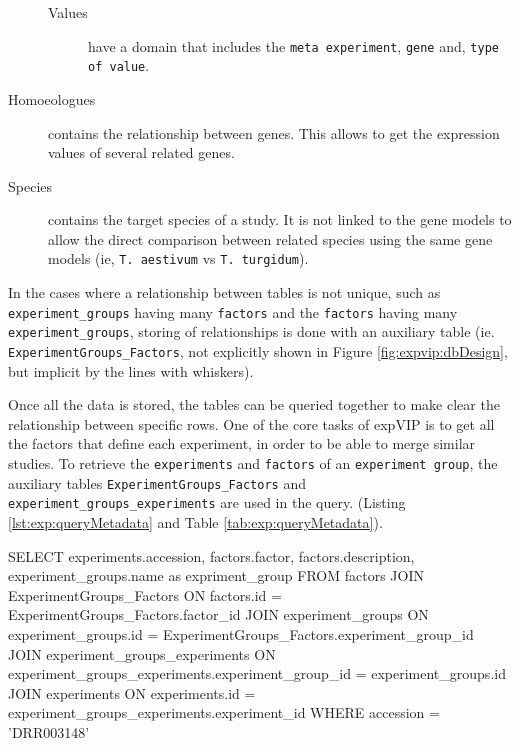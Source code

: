 \begin{description}
\begin{description}
\item[Values] have a domain that includes the \texttt{meta experiment}, \texttt{gene} and, \texttt{type of value}.
\end{description}
\item[Homoeologues] contains the relationship between genes. This allows to get the expression values of several related genes. 
\item[Species] contains the target species of a study. It is not linked to the gene models to allow the direct comparison between related species using the same gene models (ie, \texttt{T. aestivum} vs \texttt{T. turgidum}). 
\end{description}

In the cases where a relationship between tables is not unique, such as \texttt{experiment\_groups} having many \texttt{factors} and the \texttt{factors} having many \texttt{experiment\_groups}, storing of relationships is done with an auxiliary table (ie. \texttt{ExperimentGroups\_Factors}, not explicitly shown in Figure \ref{fig:expvip:dbDesign}, but implicit by the lines with whiskers). 

Once all the data is stored, the tables can be queried together to make clear the relationship between specific rows. 
One of the core tasks of expVIP is to get all the factors that define each experiment, in order to be able to merge similar studies. 
To retrieve the \texttt{experiments} and \texttt{factors} of an \texttt{experiment group}, the auxiliary tables \texttt{ExperimentGroups\_Factors}  and \texttt{experiment\_groups\_experiments} are used in the query. (Listing \ref{lst:exp:queryMetadata} and Table \ref{tab:exp:queryMetadata}).


\begin{code}[language=sql, caption={[Query experiments and factors]Query experiments and factorsQuery experiments and factors from accession 'DRR003148'},label=lst:exp:queryMetadata]
SELECT
	experiments.accession,  
	factors.factor,
	factors.description, 
	experiment_groups.name as expriment_group 
FROM factors 
JOIN ExperimentGroups_Factors 
	ON factors.id = ExperimentGroups_Factors.factor_id
JOIN experiment_groups 
	ON experiment_groups.id = ExperimentGroups_Factors.experiment_group_id
JOIN experiment_groups_experiments 
	ON experiment_groups_experiments.experiment_group_id = experiment_groups.id
JOIN experiments 
	ON experiments.id = experiment_groups_experiments.experiment_id
WHERE accession =  'DRR003148'
\end{code}

